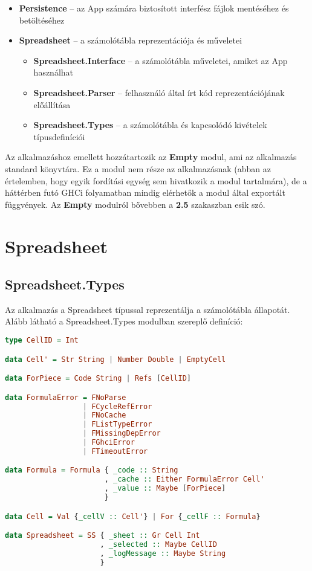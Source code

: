 \begin{itemize}
	\item \textbf{Persistence} -- az App számára biztosított interfész fájlok mentéséhez és betöltéséhez
	\item \textbf{Spreadsheet} -- a számolótábla reprezentációja és műveletei
	\begin{itemize}
		\item \textbf{Spreadsheet.Interface} -- a számolótábla műveletei, amiket az App használhat
		\item \textbf{Spreadsheet.Parser} -- felhasználó által írt kód reprezentációjának előállítása
		\item \textbf{Spreadsheet.Types} -- a számolótábla és kapcsolódó kivételek típusdefiníciói
	\end{itemize}
\end{itemize} 

Az alkalmazáshoz emellett hozzátartozik az \textbf{Empty} modul, ami az alkalmazás standard könyvtára. Ez a modul nem része az alkalmazásnak (abban az értelemben, hogy egyik fordítási egység sem hivatkozik a modul tartalmára), de a háttérben futó GHCi folyamatban mindig elérhetők a modul által exportált függvények. Az \textbf{Empty} modulról bővebben a \textbf{2.5} szakaszban esik szó.

\section{Spreadsheet}

\subsection{Spreadsheet.Types}

Az alkalmazás a Spreadsheet típussal reprezentálja a számolótábla állapotát. Alább látható a Spreadsheet.Types modulban szereplő definíció:

\begin{lstlisting}[language={Haskell}]
type CellID = Int

data Cell' = Str String | Number Double | EmptyCell

data ForPiece = Code String | Refs [CellID]

data FormulaError = FNoParse
                  | FCycleRefError
                  | FNoCache
                  | FListTypeError
                  | FMissingDepError
                  | FGhciError
                  | FTimeoutError

data Formula = Formula { _code :: String
                       , _cache :: Either FormulaError Cell'
                       , _value :: Maybe [ForPiece]
                       }

data Cell = Val {_cellV :: Cell'} | For {_cellF :: Formula}

data Spreadsheet = SS { _sheet :: Gr Cell Int
                      , _selected :: Maybe CellID
                      , _logMessage :: Maybe String
                      }
\end{lstlisting}

